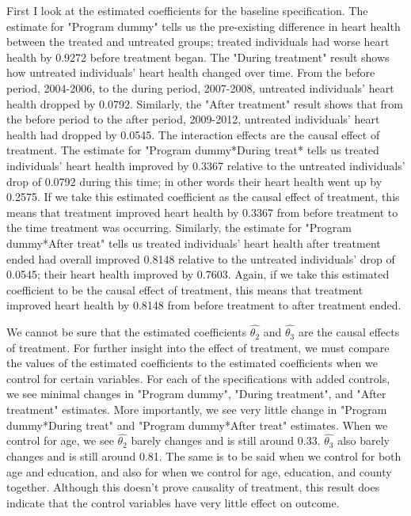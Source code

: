 \documentclass[a4paper]{article}
\begin{document}
First I look at the estimated coefficients for the baseline specification. The estimate for "Program dummy" tells us the pre-existing difference in heart health between the treated and untreated groups; treated individuals had worse heart health by 0.9272 before treatment began. The "During treatment" result shows how untreated individuals' heart health changed over time. From the before period, 2004-2006, to the during period, 2007-2008, untreated individuals' heart health dropped by 0.0792. Similarly, the "After treatment" result shows that from the before period to the after period, 2009-2012, untreated individuals' heart health had dropped by 0.0545. The interaction effects are the causal effect of treatment. The estimate for "Program dummy*During treat* tells us treated individuals' heart health improved by 0.3367 relative to the untreated individuals' drop of 0.0792 during this time; in other words their heart health went up by 0.2575. If we take this estimated coefficient as the causal effect of treatment, this means that treatment improved heart health by 0.3367 from before treatment to the time treatment was occurring. Similarly, the estimate for "Program dummy*After treat" tells us treated individuals' heart health after treatment ended had overall improved 0.8148 relative to the untreated individuals' drop of 0.0545; their heart health improved by 0.7603. Again, if we take this estimated coefficient to be the causal effect of treatment, this means that treatment improved heart health by 0.8148 from before treatment to after treatment ended.

We cannot be sure that the estimated coefficients $\hat{\theta_{2}}$ and $\hat{\theta_{3}}$ are the causal effects of treatment. For further insight into the effect of treatment, we must compare the values of the estimated coefficients to the estimated coefficients when we control for certain variables. For each of the specifications with added controls, we see minimal changes in "Program dummy", "During treatment", and "After treatment" estimates. More importantly, we see very little change in "Program dummy*During treat" and "Program dummy*After treat" estimates. When we control for age, we see $\hat{\theta_{2}}$ barely changes and is still around 0.33. $\hat{\theta_{3}}$ also barely changes and is still around 0.81. The same is to be said when we control for both age and education, and also for when we control for age, education, and county together. Although this doesn't prove causality of treatment, this result does indicate that the control variables have very little effect on outcome.
\end{document}
